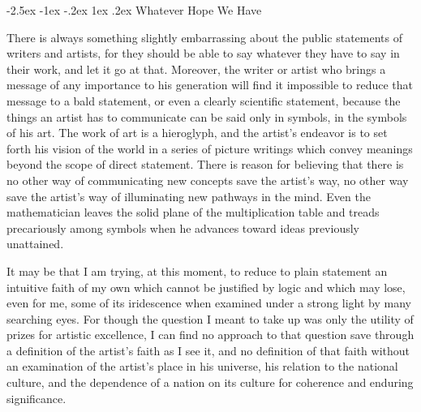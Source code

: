 \documentclass[9pt,twoside]{extarticle}
\makeatletter
\renewcommand\section{\@startsection{section}{1}{\z@}%
  {-2.5ex \@plus -1ex \@minus -.2ex}%
  {1ex \@plus .2ex}%
  {\itshape\normalsize}}
\makeatother
\begin{document}
\section{Whatever Hope We Have}

There is always something slightly embarrassing about the public statements of writers and artists, for they should be able to say whatever they have to say in their work, and let it go at that. Moreover, the writer or artist who brings a message of any importance to his generation will find it impossible to reduce that message to a bald statement, or even a clearly scientific statement, because the things an artist has to communicate can be said only in symbols, in the symbols of his art. The work of art is a hieroglyph, and the artist's endeavor is to set forth his vision of the world in a series of picture writings which convey meanings beyond the scope of direct statement. There is reason for believing that there is no other way of communicating new concepts save the artist's way, no other way save the artist's way of illuminating new pathways in the mind. Even the mathematician leaves the solid plane of the multiplication table and treads precariously among symbols when he advances toward ideas previously unattained.

It may be that I am trying, at this moment, to reduce to plain statement an intuitive faith of my own which cannot be justified by logic and which may lose, even for me, some of its iridescence when examined under a strong light by many searching eyes. For though the question I meant to take up was only the utility of prizes for artistic excellence, I can find no approach to that question save through a definition of the artist's faith as I see it, and no definition of that faith without an examination of the artist's place in his universe, his relation to the national culture, and the dependence of a nation on its culture for coherence and enduring significance.
\end{document}

